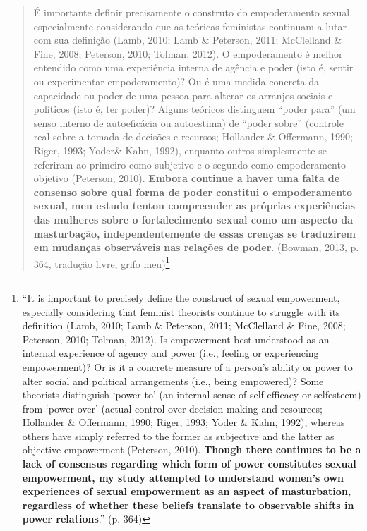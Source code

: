 \begin{quote}
    É importante definir precisamente o construto do empoderamento sexual, especialmente considerando que as teóricas feministas continuam a lutar com sua definição (Lamb, 2010; Lamb \& Peterson, 2011; McClelland \& Fine, 2008; Peterson, 2010; Tolman, 2012). O empoderamento é melhor entendido como uma experiência interna de agência e poder (isto é, sentir ou experimentar empoderamento)? Ou é uma medida concreta da capacidade ou poder de uma pessoa para alterar os arranjos sociais e políticos (isto é, ter poder)? Alguns teóricos distinguem ``poder para'' (um senso interno de autoeficácia ou autoestima) de ``poder sobre'' (controle real sobre a tomada de decisões e recursos; Hollander \& Offermann, 1990; Riger, 1993; Yoder\& Kahn, 1992), enquanto outros simplesmente se referiram ao primeiro como subjetivo e o segundo como empoderamento objetivo (Peterson, 2010). \textbf{Embora continue a haver uma falta de consenso sobre qual forma de poder constitui o empoderamento sexual, meu estudo tentou compreender as próprias experiências das mulheres sobre o fortalecimento sexual como um aspecto da masturbação, independentemente de essas crenças se traduzirem em mudanças observáveis nas relações de poder}. (Bowman, 2013, p. 364, tradução livre, grifo meu)\footnote{``It is important to precisely define the construct of sexual empowerment, especially considering that feminist theorists continue to struggle with its definition (Lamb, 2010; Lamb \& Peterson, 2011; McClelland \& Fine, 2008; Peterson, 2010; Tolman, 2012). Is empowerment best understood as an internal experience of agency and power (i.e., feeling or experiencing empowerment)? Or is it a concrete measure of a person’s ability or power to alter social and political arrangements (i.e., being empowered)? Some theorists distinguish ‘power to’ (an internal sense of self-efficacy or selfesteem) from ‘power over’ (actual control over decision making and resources; Hollander \& Offermann, 1990; Riger, 1993; Yoder \& Kahn, 1992), whereas others have simply referred to the former as subjective and the latter as objective empowerment (Peterson, 2010). \textbf{Though there continues to be a lack of consensus regarding which form of power constitutes sexual empowerment, my study attempted to understand women’s own experiences of sexual empowerment as an aspect of masturbation, regardless of whether these beliefs translate to observable shifts in power relations}.'' (p. 364)}
\end{quote}

